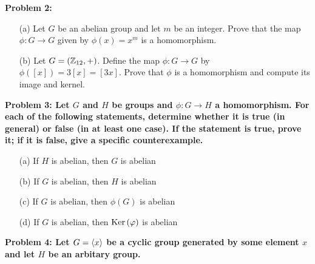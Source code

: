 \documentclass[11pt]{amsart}
\begin{document}
\bf{Problem 2: }\rm 
\begin{itemize}
\item[(a)] Let $G$ be an abelian group and let $m$ be an integer. Prove that the map
$\phi:G\to G$ given by $\phi(x)=x^m$ is a homomorphism.
\item[(b)] Let $G=({\mathbb Z}_{12},+)$.
Define the map $\phi:G \to G$ by $\phi([x])=3[x]=[3x]$.
Prove that $\phi$ is a homomorphism and compute its image and kernel. 
\end{itemize}
\skv
\bf{Problem 3: }\rm Let $G$ and $H$ be groups and $\phi:G\to H$ a homomorphism.
For each of the following statements, determine whether it is true (in general)
or false (in at least one case). If the statement is true, prove it; if it is false,
give a specific counterexample.
\begin{itemize}
\item[(a)] If $H$ is abelian, then $G$ is abelian
\item[(b)] If $G$ is abelian, then $H$ is abelian
\item[(c)] If $G$ is abelian, then $\phi(G)$ is abelian
\item[(d)] If $G$ is abelian, then ${\rm Ker\,}({\varphi})$ is abelian
\end{itemize}
\skv
\bf{Problem 4: }\rm Let $G={\langle} x{\rangle}$ be a cyclic group generated by some element $x$ and let $H$ be an arbitary group.
\end{document}
